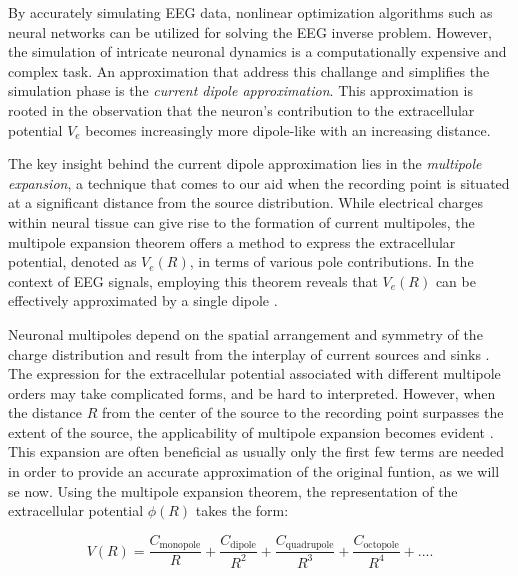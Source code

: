 \documentclass[a4paper, UKenglish, 11pt]{uiomaster}
\begin{document}
By accurately simulating EEG data, nonlinear optimization algorithms such as neural networks can be utilized for solving the EEG inverse problem. However, the simulation of intricate neuronal dynamics is a computationally expensive and complex task.  An approximation that address this challange and simplifies the simulation phase is the \emph{current dipole approximation}. This approximation is rooted in the observation that the neuron's contribution to the extracellular potential $V_e$ becomes increasingly more dipole-like with an increasing distance.

The key insight behind the current dipole approximation lies in the \emph{multipole expansion}, a technique that comes to our aid when the recording point is situated at a significant distance from the source distribution. While electrical charges within neural tissue can give rise to the formation of current multipoles, the multipole expansion theorem offers a method to express the extracellular potential, denoted as $V_e(R)$, in terms of various pole contributions. In the context of EEG signals, employing this theorem reveals that $V_e(R)$ can be effectively approximated by a single dipole \cite{brainmodel2022}. 

Neuronal multipoles depend on the spatial arrangement and symmetry of the charge distribution and result from the interplay of current sources and sinks \cite{wiki:multipoles}. The expression for the extracellular potential associated with different multipole orders may take complicated forms, and be hard to interpreted. However, when the distance $R$ from the center of the source to the recording point surpasses the extent of the source, the applicability of multipole expansion becomes evident \cite{jackson1999classical} . This expansion are often beneficial as usually only the first few terms are needed in order to provide an accurate approximation of the original funtion, as we will se now. Using the multipole expansion theorem, the representation of the extracellular potential $\phi(R)$ takes the form:

\begin{equation}
  V(R) = \frac{C_{\text{monopole}}}{R} + \frac{C_{\text{dipole}}}{R^2} + \frac{C_{\text{quadrupole}}}{R^3} + \frac{C_{\text{octopole}}}{R^4} + ... .
\label{eq:extracellular_potential}
\end{equation}
\end{document}
